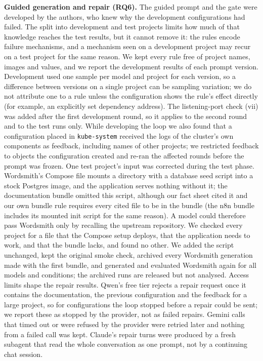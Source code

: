 
\textbf{Guided generation and repair (RQ6).} The guided prompt and the gate were developed by the authors, who knew why the development configurations had failed. The split into development and test projects limits how much of that knowledge reaches the test results, but it cannot remove it: the rules encode failure mechanisms, and a mechanism seen on a development project may recur on a test project for the same reason. We kept every rule free of project names, images and values, and we report the development results of each prompt version. Development used one sample per model and project for each version, so a difference between versions on a single project can be sampling variation; we do not attribute one to a rule unless the configuration shows the rule's effect directly (for example, an explicitly set dependency address). The listening-port check (vii) was added after the first development round, so it applies to the second round and to the test runs only. While developing the loop we also found that a configuration placed in \texttt{kube-system} received the logs of the cluster's own components as feedback, including names of other projects; we restricted feedback to objects the configuration created and re-ran the affected rounds before the prompt was frozen. One test project's input was corrected during the test phase. Wordsmith's Compose file mounts a directory with a database seed script into a stock Postgres image, and the application serves nothing without it; the documentation bundle omitted this script, although our fact sheet cited it and our own bundle rule requires every cited file to be in the bundle (the n8n bundle includes its mounted init script for the same reason). A model could therefore pass Wordsmith only by recalling the upstream repository. We checked every project for a file that the Compose setup deploys, that the application needs to work, and that the bundle lacks, and found no other. We added the script unchanged, kept the original smoke check, archived every Wordsmith generation made with the first bundle, and generated and evaluated Wordsmith again for all models and conditions; the archived runs are released but not analysed. Access limits shape the repair results. Qwen's free tier rejects a repair request once it contains the documentation, the previous configuration and the feedback for a large project, so for  configurations the loop stopped before a repair could be sent; we report these as stopped by the provider, not as failed repairs. Gemini calls that timed out or were refused by the provider were retried later and nothing from a failed call was kept. Claude's repair turns were produced by a fresh subagent that read the whole conversation as one prompt, not by a continuing chat session.
